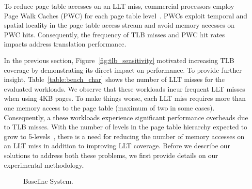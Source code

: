 


To reduce page table accesses on an LLT miss, commercial processors
employ Page Walk Caches (PWC) for each page table level~\cite{SkipPT,
MMUcaches}. PWCs exploit temporal and spatial locality in the page
table access stream and avoid memory accesses on PWC hits.
Consequently, the frequency of TLB misses and PWC hit rates impacts
address translation performance.



In the previous section, Figure~\ref{fig:tlb_sensitivity} motivated
increasing TLB coverage by demonstrating its direct impact on
performance. To provide further insight, Table~\ref{table:bench_char}
shows the number of LLT misses for the evaluated workloads. We observe
that these workloads incur frequent LLT misses when using 4KB pages.
To make things worse, each LLT miss requires more than one memory
access to the page table (maximum of two in some cases). Consequently,
a these workloads experience significant performance overheads due to
TLB misses. With the number of levels in the page table hierarchy
expected to grow to 5-levels~\cite{x86_5level}, there is a need for
reducing the number of memory accesses on an LLT miss in addition to
improving LLT coverage. Before we describe our solutions to address
both these problems, we first provide details on our experimental
methodology.

\begin{figure}[t]
\vspace{0. in}
\centering
\centerline{}

        \caption{\small Baseline System. \normalsize}

\label{fig:config}
\vspace{-.2 in}
\end{figure}

